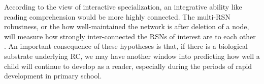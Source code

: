According to the view of interactive specialization, an integrative ability like reading comprehension would be more highly connected. The multi-RSN robustness, or the how well-maintained the network is after deletion of a node, will measure how strongly inter-connected the RSNs of interest are to each other \cite{Bullmore2009}. An important consequence of these hypotheses is that, if there is a biological substrate underlying RC, we may have another window into predicting how well a child will continue to develop as a reader, especially during the periods of rapid development in primary school.




